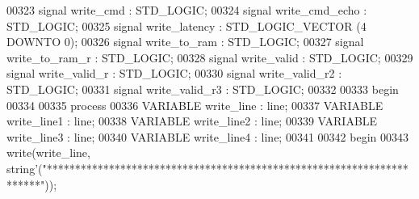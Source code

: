 \begin{DoxyCode}
00323                 \textcolor{keywordflow}{signal} \textcolor{vhdlchar}{write_cmd} \textcolor{vhdlchar}{:}  \textcolor{comment}{STD\_LOGIC};
00324                 \textcolor{keywordflow}{signal} \textcolor{vhdlchar}{write_cmd_echo} \textcolor{vhdlchar}{:}  \textcolor{comment}{STD\_LOGIC};
00325                 \textcolor{keywordflow}{signal} \textcolor{vhdlchar}{write_latency} \textcolor{vhdlchar}{:}  \textcolor{comment}{STD\_LOGIC\_VECTOR} \textcolor{vhdlchar}{(}\textcolor{vhdllogic}{}\textcolor{vhdllogic}{4} \textcolor{keywordflow}{DOWNTO} \textcolor{vhdllogic}{}\textcolor{vhdllogic}{0}\textcolor{vhdlchar}{)};
00326                 \textcolor{keywordflow}{signal} \textcolor{vhdlchar}{write_to_ram} \textcolor{vhdlchar}{:}  \textcolor{comment}{STD\_LOGIC};
00327                 \textcolor{keywordflow}{signal} \textcolor{vhdlchar}{write_to_ram_r} \textcolor{vhdlchar}{:}  \textcolor{comment}{STD\_LOGIC};
00328                 \textcolor{keywordflow}{signal} \textcolor{vhdlchar}{write_valid} \textcolor{vhdlchar}{:}  \textcolor{comment}{STD\_LOGIC};
00329                 \textcolor{keywordflow}{signal} \textcolor{vhdlchar}{write_valid_r} \textcolor{vhdlchar}{:}  \textcolor{comment}{STD\_LOGIC};
00330                 \textcolor{keywordflow}{signal} \textcolor{vhdlchar}{write_valid_r2} \textcolor{vhdlchar}{:}  \textcolor{comment}{STD\_LOGIC};
00331                 \textcolor{keywordflow}{signal} \textcolor{vhdlchar}{write_valid_r3} \textcolor{vhdlchar}{:}  \textcolor{comment}{STD\_LOGIC};
00332 
00333 \textcolor{vhdlkeyword}{begin}
00334 
00335   \textcolor{keywordflow}{process}
00336 \textcolor{keywordflow}{VARIABLE} \textcolor{vhdlchar}{write\_line} \textcolor{vhdlchar}{:} \textcolor{vhdlchar}{line};
00337 \textcolor{keywordflow}{VARIABLE} \textcolor{vhdlchar}{write\_line1} \textcolor{vhdlchar}{:} \textcolor{vhdlchar}{line};
00338 \textcolor{keywordflow}{VARIABLE} \textcolor{vhdlchar}{write\_line2} \textcolor{vhdlchar}{:} \textcolor{vhdlchar}{line};
00339 \textcolor{keywordflow}{VARIABLE} \textcolor{vhdlchar}{write\_line3} \textcolor{vhdlchar}{:} \textcolor{vhdlchar}{line};
00340 \textcolor{keywordflow}{VARIABLE} \textcolor{vhdlchar}{write\_line4} \textcolor{vhdlchar}{:} \textcolor{vhdlchar}{line};
00341 
00342 \textcolor{vhdlkeyword}{    begin}
00343       \textcolor{vhdlchar}{write}\textcolor{vhdlchar}{(}\textcolor{vhdlchar}{write\_line}\textcolor{vhdlchar}{,} \textcolor{comment}{string}\textcolor{vhdlchar}{'}\textcolor{vhdlchar}{(}\textcolor{keyword}{"**********************************************************************"}\textcolor{vhdlchar}{)}\textcolor{vhdlchar}{)};

\end{DoxyCode}

